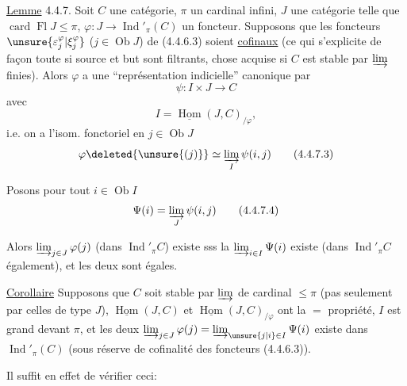 \uline{Lemme} 4.4.7. Soit $C$ une  catégorie, $\pi$ un cardinal infini,  $J$ une    catégorie  telle que $\operatorname{card}\operatorname{Fl}J\leq\pi$, $\varphi:J\longrightarrow\operatorname{Ind}'_{\pi}(C)$ un foncteur. Supposons  que les  foncteurs $\unsure{\varepsilon_j^{\varphi}|\xi_j^{\varphi}}$ ($j\in\operatorname{Ob}J$) de (4.4.6.3) soient \uline{cofinaux} (ce qui s'explicite de façon toute  si source et but sont filtrants, chose acquise si $C$ est stable par $\varinjlim$ finies). Alors $\varphi$ a une ``représentation indicielle'' canonique  par
\[
\psi:I\times J\longrightarrow C\tag*{(4.4.7.1)}
\]
avec
\[
I=\underline{\operatorname{Hom}}(J,C)_{/\varphi},\tag*{(4.4.7.1)}
\]
i.e. on a l'isom. fonctoriel en $j\in\operatorname{Ob}J$
\[
\varphi\deleted{\unsure{(j)}}\simeq\varinjlim_I\psi(i,j)\tag*{(4.4.7.3)}
\]

Posons pour tout $i\in\operatorname{Ob}I$
\[
\Psi(i)=\varinjlim_J\psi(i,j)\tag*{(4.4.7.4)}
\]

Alors  $\varinjlim_{j\in J}\varphi(j)$ (dans $\operatorname{Ind}'_{\pi}C$) existe sss
la $\varinjlim_{i\in I}\Psi(i)$ existe (dans $\operatorname{Ind}'_{\pi}C$ également), et les deux sont égales.

\uline{Corollaire}  Supposons que $C$ soit stable par $\varinjlim$ de cardinal $\leq\pi$ (pas seulement par celles de type $J$),  $\underline{\operatorname{Hom}}(J,C)$ et  $\underline{\operatorname{Hom}}(J,C)_{/\varphi}$ ont la $=$ propriété, $I$ est grand devant $\pi$, et les deux $\varinjlim_{j\in J}\varphi(j)=\varinjlim_{\unsure{j|i}\in I}\Psi(i)$ existe dans $\operatorname{Ind}'_{\pi}(C)$ (sous réserve de cofinalité des foncteurs (4.4.6.3)).

Il suffit en effet de vérifier ceci:

